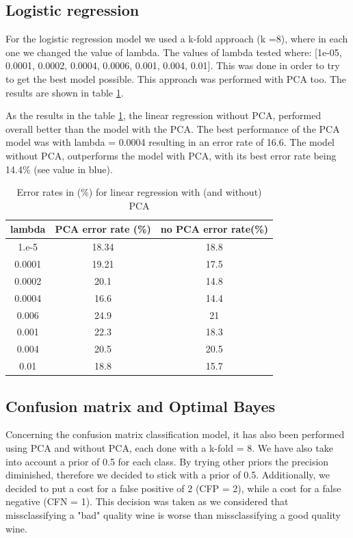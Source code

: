 \documentclass[twoside,a4paper,12pt]{report}
\begin{document}
\subsection{Logistic regression}
For the logistic regression model we used  a k-fold approach (k =8), where in each 
one we changed the value of lambda. The values of lambda tested where: 
[1e-05, 0.0001, 0.0002, 0.0004, 0.0006, 0.001, 0.004, 0.01]. 
This was done in order to try to get the best model possible.
 This approach was performed with PCA too.
The results are shown in table \ref{errorRateslinearregression}.


As the results in the table \ref{errorRateslinearregression}, the linear regression
without PCA, performed overall better than the model with the PCA.
The best performance of the PCA model was with lambda = 0.0004 
resulting in an error rate of 16.6. The model without PCA, outperforms the model 
with PCA, with its best error rate being 14.4\% (see value in blue).

\begin{table}
    \centering
     \begin{tabular}{||c c c ||} 
        \hline \hline
        lambda & PCA error rate (\%) & no PCA error rate(\%)\\
        \hline\hline
        1.e-5  & 18.34  & 18.8   \\ 
        \hline
        0.0001 & 19.21  &  17.5  \\ 
        \hline
        0.0002 & 20.1  &  14.8  \\ 
        \hline
        0.0004 & 16.6  &  \cellcolor{blue!25}  14.4  \\ 
        \hline
        0.006  & 24.9  & 21    \\ 
        \hline
        0.001  & 22.3  &  18.3  \\ 
        \hline
        0.004 & 20.5  &  20.5  \\ 
        \hline
        0.01  &  18.8 & 15.7   \\ 
        \hline \hline
    \end{tabular}
    \caption{Error rates in (\%) for linear regression with (and without) PCA     \label{errorRateslinearregression}
    }
    \end{table}


\subsection{Confusion matrix and Optimal Bayes}
Concerning the confusion matrix classification model, it has also been performed 
using PCA and without PCA, each done with a k-fold = 8.
We have also take into account a prior of 0.5 for each class. By trying other priors
the precision diminished, therefore we decided to stick with a prior of 0.5. 
Additionally, we decided to put a cost for a false positive of 2 (CFP = 2), while a cost
for a false negative (CFN = 1). This decision was taken as we considered
that missclassifying a "bad" quality wine is worse than missclassifying a 
good quality wine.
\end{document}
